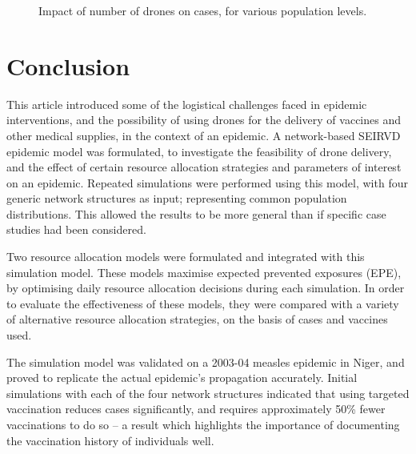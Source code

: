 \documentclass[10pt,letterpaper]{article}
\begin{document}
\begin{figure}[ht!]
\begin{center}
    \caption{Impact of number of drones on cases, for various population levels.} 
    \label{fig:sens_num_drones}
\end{center}
\end{figure}

\section*{Conclusion}
This article introduced some of the logistical challenges faced in epidemic interventions, and the possibility of using drones for the delivery of vaccines and other medical supplies, in the context of an epidemic.
A network-based SEIRVD epidemic model was formulated, to investigate the feasibility of drone delivery, and the effect of certain resource allocation strategies and parameters of interest on an epidemic. Repeated simulations were performed using this model, with four generic network structures as input; representing common population distributions. This allowed the results to be more general than if specific case studies had been considered.

Two resource allocation models were formulated and integrated with this simulation model. These models maximise expected prevented exposures (EPE), by optimising daily resource allocation decisions during each simulation. In order to evaluate the effectiveness of these models, they were compared with a variety of alternative resource allocation strategies, on the basis of cases and vaccines used.

The simulation model was validated on a 2003-04 measles epidemic in Niger, and proved to replicate the actual epidemic's propagation accurately. Initial simulations with each of the four network structures indicated that using targeted vaccination reduces cases significantly, and requires approximately 50\% fewer vaccinations to do so -- a result which highlights the importance of documenting the vaccination history of individuals well.
\end{document}
